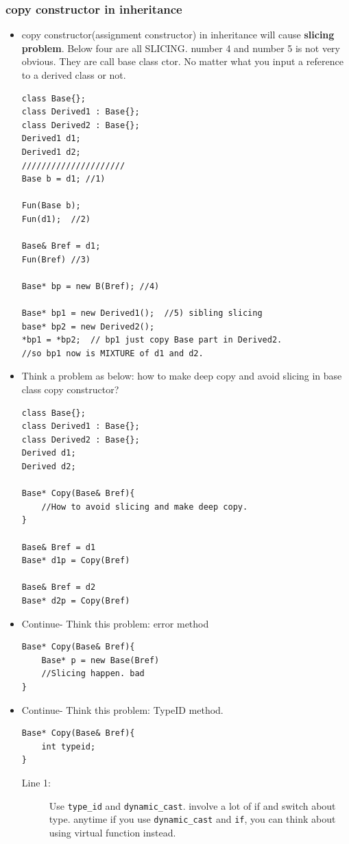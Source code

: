 \documentclass[a4paper,11pt,twoside]{book}
\begin{document}
\subsubsection{copy constructor in inheritance}

\begin{itemize}
	\item copy constructor(assignment constructor) in inheritance will cause \textbf{slicing problem}.   Below four are all SLICING.  number 4 and number 5 is not very obvious. They are call base class ctor.  No matter what you input a reference to a derived class or not.
\begin{lstlisting}[numbers=none]
class Base{};
class Derived1 : Base{};
class Derived2 : Base{};
Derived1 d1;
Derived1 d2;
/////////////////////
Base b = d1; //1)
	
Fun(Base b);
Fun(d1);  //2)
	
Base& Bref = d1;
Fun(Bref) //3)
	
Base* bp = new B(Bref); //4)
	
Base* bp1 = new Derived1();  //5) sibling slicing
base* bp2 = new Derived2();
*bp1 = *bp2;  // bp1 just copy Base part in Derived2.
//so bp1 now is MIXTURE of d1 and d2.
\end{lstlisting}
	
\item Think a problem as below: how to make deep copy and avoid slicing in base class copy constructor?
\begin{lstlisting}[numbers=none]
class Base{};
class Derived1 : Base{};
class Derived2 : Base{};
Derived d1;
Derived d2;
	
Base* Copy(Base& Bref){
	//How to avoid slicing and make deep copy.
}
	
Base& Bref = d1
Base* d1p = Copy(Bref)

Base& Bref = d2
Base* d2p = Copy(Bref)
	\end{lstlisting}
	
\item Continue- Think this problem: error method
\begin{lstlisting}[numbers=none]
Base* Copy(Base& Bref){
	Base* p = new Base(Bref)
	//Slicing happen. bad
}
\end{lstlisting}
	\item Continue- Think this problem: TypeID method.
\begin{lstlisting}[numbers=none]
Base* Copy(Base& Bref){
	int typeid;
}
\end{lstlisting}
\begin{description}
	\item[Line 1:] Use \texttt{type\_id} and \texttt{dynamic\_cast}. involve a lot of if and switch about type. anytime if you use \texttt{dynamic\_cast} and \texttt{if}, you can think about using virtual function instead.
\end{description}
	

\end{itemize}
\end{document}
